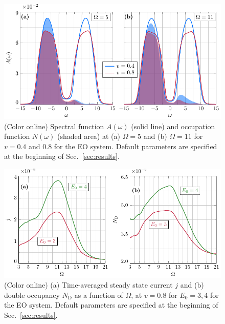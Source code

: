 \documentclass[aps,prb,groupedaddress,showpacs,twocolumn,superscriptaddress,10pt]{revtex4-2}
\begin{document}
\begin{figure}[b] 
\includegraphics[width=\linewidth]{Fig4.pdf}
\caption{(Color online) Spectral function $A(\omega)$ (solid line) and occupation function $N(\omega)$ (shaded area) at (a) $\Omega=5$ and (b) $\Omega=11$ for $v=0.4$ and $0.8$ for the EO system. Default parameters are specified at the beginning of Sec.~\ref{sec:results}.}
\label{fig:spec_filling_mu1_v_0.4_0.8_O_5_11_e}
\end{figure} 

\begin{figure}[b]  
\includegraphics[width=\linewidth]{Fig5.pdf} 
\caption{(Color online) (a) Time-averaged steady state current $j$ and (b) double occupancy $N_{\text{D}}$ as a function of $\Omega$, at $v=0.8$ for $E_0=3,4$ for the EO system. Default parameters are specified at the beginning of Sec.~\ref{sec:results}.} 
\label{fig:j_vs_omega_mu1_v_0.8_e_E0_3_4}
\end{figure}
\end{document}
